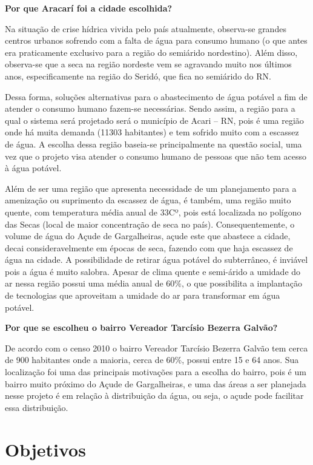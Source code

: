 \textbf{Por que  Aracarí foi a cidade escolhida?}

Na situação de crise hídrica vivida pelo país atualmente, observa-se grandes centros urbanos sofrendo com a falta de água
para consumo humano (o que antes era praticamente exclusivo para a região do semiárido nordestino). Além disso, observa-se que
a seca na região nordeste vem se agravando muito nos últimos anos, especificamente na região do Seridó, que fica no semiárido do RN.

Dessa forma, soluções alternativas para o abastecimento de água potável a fim de atender o consumo humano fazem-se necessárias. 
Sendo assim, a região para a qual o sistema será projetado será o município de Acari – RN, pois é uma região onde há muita
demanda (11303 habitantes) e tem sofrido muito com a escassez de água. A escolha dessa região baseia-se principalmente na 
questão social, uma vez que o projeto visa atender o consumo humano de pessoas que não tem acesso à água potável.

Além de ser uma região que apresenta necessidade de um planejamento para a amenização ou suprimento da escassez de água, é 
também, uma região muito quente, com temperatura média anual de 33Cº, pois está localizada no polígono das Secas 
(local de maior concentração de seca no país). Consequentemente, o volume de água do Açude de Gargalheiras, açude este que
abastece a cidade, decai consideravelmente em épocas de seca, fazendo com que haja escassez de água na cidade. A possibilidade
de retirar água potável do subterrâneo, é inviável pois a água é muito salobra. Apesar de clima quente e semi-árido a umidade
do ar nessa região  possui uma média anual de 60\%, o que possibilita a implantação de tecnologias que aproveitam a umidade do ar
para transformar em água potável.

\textbf{Por que se escolheu o bairro Vereador Tarcísio Bezerra Galvão?}

De acordo com o censo 2010 o bairro Vereador Tarcísio Bezerra Galvão tem cerca de 900 habitantes onde a maioria, cerca de 60\%,
possui entre 15 e 64 anos. Sua localização foi uma das principais motivações para a escolha do bairro, pois é um bairro muito
próximo do Açude de Gargalheiras, e uma das áreas a ser planejada nesse projeto é em relação à distribuição da água, ou seja,
o açude pode facilitar essa distribuição.


\section{Objetivos}

